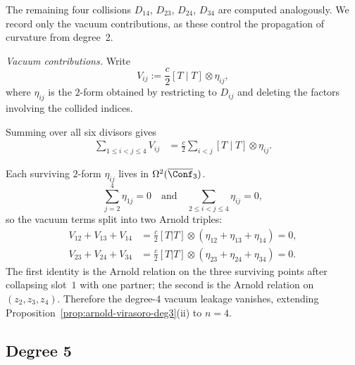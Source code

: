 \begin{computation}
The remaining four collisions $D_{14}$, $D_{23}$, $D_{24}$, $D_{34}$
are computed analogously.  We record only the vacuum contributions,
as these control the propagation of curvature from degree~2.

\emph{Vacuum contributions.}
Write
\[
V_{ij} := \frac{c}{2} [T \mid T] \otimes \eta_{ij},
\]
where $\eta_{ij}$ is the $2$-form obtained by restricting to
$D_{ij}$ and deleting the factors involving the collided indices.

Summing over all six divisors gives
\begin{align}
\sum_{1 \leq i < j \leq 4} V_{ij}
&= \frac{c}{2} \sum_{i < j} [T \mid T] \otimes \eta_{ij}.
\label{eq:vir-deg4-vacuum}
\end{align}

Each surviving $2$-form $\eta_{ij}$ lives in $\Omega^2(\overline{\Conf}_3)$.
\begin{equation}\label{eq:vir-deg4-arnold}
\sum_{j=2}^{4} \eta_{1j} = 0
\quad \text{and} \quad
\sum_{2 \leq i < j \leq 4} \eta_{ij} = 0,
\end{equation}
so the vacuum terms split into two Arnold triples:
\begin{align*}
V_{12} + V_{13} + V_{14}
&= \frac{c}{2}[T|T] \otimes
  (\eta_{12} + \eta_{13} + \eta_{14}) = 0, \\
V_{23} + V_{24} + V_{34}
&= \frac{c}{2}[T|T] \otimes
  (\eta_{23} + \eta_{24} + \eta_{34}) = 0.
\end{align*}
The first identity is the Arnold relation on the three surviving
points after collapsing slot~$1$ with one partner; the second is the
Arnold relation on $(z_2, z_3, z_4)$.  Therefore the degree-4 vacuum
leakage vanishes, extending
Proposition~\ref{prop:arnold-virasoro-deg3}(ii) to $n = 4$.
\end{computation}

\subsection{Degree 5}

